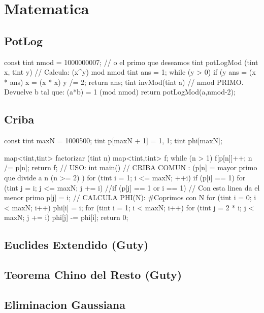 \section{Matematica}

\subsection{PotLog}
\begin{code}
const tint nmod = 1000000007; // o el primo que deseamos
tint potLogMod (tint x, tint y) // Calcula: (x^y) mod nmod
{
	tint ans = 1;
	while (y > 0)
	{
		if (y %
			ans = (x * ans) %
		x = (x * x) %
		y /= 2;
	}
	return ans;
}
tint invMod(tint a) // nmod PRIMO. Devuelve b tal que: (a*b) = 1 (mod nmod) 
{
	return potLogMod(a,nmod-2);
}
\end{code}

\subsection{Criba}
\begin{code}
const tint maxN = 1000500;
tint p[maxN + 1] = {1, 1};
tint phi[maxN]; 

map<tint,tint> factorizar (tint n)
{
	map<tint,tint> f;
	while (n > 1) 
	{ 
		f[p[n]]++;
		n /= p[n]; 
	}
	return f;
}
// USO:
int main()
{
	// CRIBA COMUN : (p[n] = mayor primo que divide a n (n >= 2) )
	for (tint i = 1; i <= maxN; ++i)
		if (p[i] == 1)
			for (tint j = i; j <= maxN; j += i)
				//if (p[j] == 1 or i == 1) // Con esta linea da el menor primo
				p[j] = i;
	// CALCULA PHI(N): #Coprimos con N
	for (tint i = 0; i < maxN; i++) 
		phi[i] = i;	
	for (tint i = 1; i < maxN; i++)
	for (tint j = 2 * i; j < maxN; j += i)
		phi[j] -= phi[i];
	return 0;
}
\end{code}

\subsection{Euclides Extendido (Guty)}
\begin{code}
\end{code}

\subsection{Teorema Chino del Resto (Guty)}
\begin{code}
\end{code}

\subsection{Eliminacion Gaussiana}
\begin{code}
\end{code}

